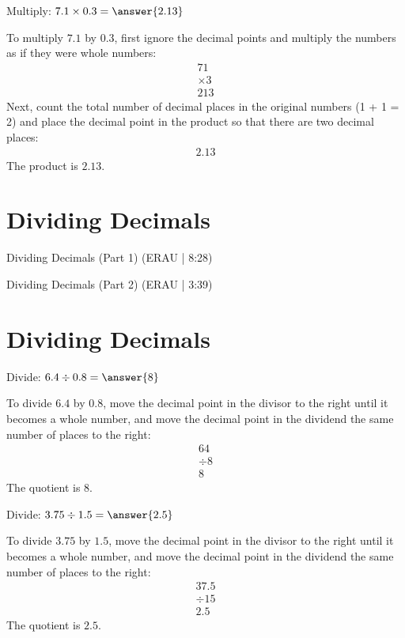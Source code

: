 \documentclass{ximera}
\begin{document}
\begin{problem}
Multiply: $7.1 \times 0.3 = \answer{2.13}$
\begin{feedback}
To multiply $7.1$ by $0.3$, first ignore the decimal points and multiply the numbers as if they were whole numbers:
\begin{align*}
   71 \\
\times   3 \\
\hline
   213
\end{align*}
Next, count the total number of decimal places in the original numbers (1 + 1 = 2) and place the decimal point in the product so that there are two decimal places:
\begin{align*}
   2.13
\end{align*}
The product is $2.13$.
\end{feedback}
\end{problem}


\section*{Dividing Decimals}

Dividing Decimals (Part 1) (ERAU | 8:28)


Dividing Decimals (Part 2) (ERAU | 3:39)



\section*{Dividing Decimals}

\begin{problem}
Divide: $6.4 \div 0.8 = \answer{8}$
\begin{feedback}
To divide $6.4$ by $0.8$, move the decimal point in the divisor to the right until it becomes a whole number, and move the decimal point in the dividend the same number of places to the right:
\begin{align*}
  64 \\
\div 8 \\
\hline
  8
\end{align*}
The quotient is $8$.
\end{feedback}
\end{problem}

\begin{problem}
Divide: $3.75 \div 1.5 = \answer{2.5}$
\begin{feedback}
To divide $3.75$ by $1.5$, move the decimal point in the divisor to the right until it becomes a whole number, and move the decimal point in the dividend the same number of places to the right:
\begin{align*}
  37.5 \\
\div 15 \\
\hline
  2.5
\end{align*}
The quotient is $2.5$.
\end{feedback}
\end{problem}
\end{document}
